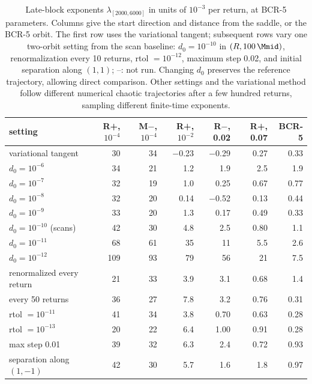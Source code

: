 \begin{table}[!tbp]
\centering\small
\caption{Late-block exponents $\lambda_{[2000,6000]}$ in units of $10^{-3}$ per return, at BCR-5 parameters.
Columns give the start direction and distance from the saddle, or the BCR-5 orbit.
The first row uses the variational tangent; subsequent rows vary one two-orbit setting from the scan baseline:
$d_0 = 10^{-10}$ in $(R,100\,\Mmid)$, renormalization every 10 returns, rtol $=10^{-12}$, maximum step 0.02, and
initial separation along $(1,1)$; --: not run.
Changing $d_0$ preserves the reference trajectory, allowing direct comparison.
Other settings and the variational method follow different numerical chaotic trajectories after a few hundred
returns, sampling different finite-time exponents.}
\label{tab:convergence}
\setlength{\tabcolsep}{5pt}
\begin{tabular}{lrrrrrr}
\toprule
setting & R+, $10^{-4}$ & M$-$, $10^{-4}$ & R+, $10^{-2}$ & R$-$, 0.02 & R+, 0.07 & BCR-5 \\
\midrule
variational tangent & 30 & 34 & $-$0.23 & $-$0.29 & 0.27 & 0.33 \\
\midrule
$d_0 = 10^{-6}$ & 34 & 21 & 1.2 & 1.9 & 2.5 & 1.9 \\
$d_0 = 10^{-7}$ & 32 & 19 & 1.0 & 0.25 & 0.67 & 0.77 \\
$d_0 = 10^{-8}$ & 32 & 20 & 0.14 & $-$0.52 & 0.13 & 0.44 \\
$d_0 = 10^{-9}$ & 33 & 20 & 1.3 & 0.17 & 0.49 & 0.33 \\
$d_0 = 10^{-10}$ (scans) & 42 & 30 & 4.8 & 2.5 & 0.80 & 1.1 \\
$d_0 = 10^{-11}$ & 68 & 61 & 35 & 11 & 5.5 & 2.6 \\
$d_0 = 10^{-12}$ & 109 & 93 & 79 & 56 & 21 & 7.5 \\
\midrule
renormalized every return & 21 & 33 & 3.9 & 3.1 & 0.68 & 1.4 \\
every 50 returns & 36 & 27 & 7.8 & 3.2 & 0.76 & 0.31 \\
rtol $= 10^{-11}$ & 41 & 34 & 3.8 & 0.70 & 0.63 & 0.28 \\
rtol $= 10^{-13}$ & 20 & 22 & 6.4 & 1.00 & 0.91 & 0.28 \\
max step 0.01 & 39 & 32 & 6.3 & 2.4 & 0.72 & 0.93 \\
separation along $(1, -1)$ & 42 & 30 & 5.7 & 1.6 & 1.8 & 0.97 \\
\bottomrule
\end{tabular}
\end{table}
